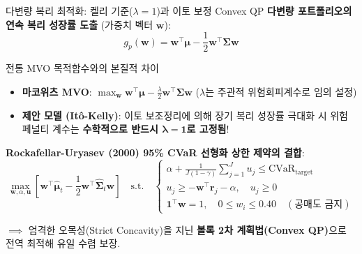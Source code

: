 \begin{frame}{다변량 복리 최적화: 켈리 기준($\lambda=1$)과 이토 보정 Convex QP}
\textbf{다변량 포트폴리오의 연속 복리 성장률 도출} (가중치 벡터 $\mathbf{w}$):
\begin{equation*}
  g_p(\mathbf{w}) = \mathbf{w}^\top \boldsymbol{\mu} - \frac{1}{2} \mathbf{w}^\top \boldsymbol{\Sigma} \mathbf{w}
\end{equation*}

\begin{block}{전통 MVO 목적함수와의 본질적 차이}
  \small
  \begin{itemize}
    \item \textbf{마코위츠 MVO}: $\max_{\mathbf{w}} \mathbf{w}^\top \boldsymbol{\mu} - \frac{\lambda}{2} \mathbf{w}^\top \boldsymbol{\Sigma} \mathbf{w}$ ($\lambda$는 주관적 위험회피계수로 임의 설정)
    \item \textbf{제안 모델 (Itô-Kelly)}: 이토 보조정리에 의해 장기 복리 성장률 극대화 시 위험 페널티 계수는 \textbf{수학적으로 반드시 $\boldsymbol{\lambda=1}$로 고정됨}!
  \end{itemize}
\end{block}

\vspace{1mm}
\textbf{Rockafellar-Uryasev (2000) 95\% CVaR 선형화 상한 제약의 결합}:
\begin{equation*}
  \max_{\mathbf{w}, \alpha, \mathbf{u}} \left[ \mathbf{w}^\top \hat{\boldsymbol{\mu}}_t - \frac{1}{2} \mathbf{w}^\top \hat{\boldsymbol{\Sigma}}_t \mathbf{w} \right] \quad
  \text{s.t.} \quad 
  \begin{cases}
    \alpha + \frac{1}{J(1-\gamma)} \sum_{j=1}^J u_j \le \text{CVaR}_{\text{target}} \\
    u_j \ge -\mathbf{w}^\top \mathbf{r}_j - \alpha, \quad u_j \ge 0 \\
    \mathbf{1}^\top \mathbf{w} = 1, \quad 0 \le w_i \le 0.40 \quad (\text{공매도 금지})
  \end{cases}
\end{equation*}

\vspace{1mm}
$\implies$ 엄격한 오목성(Strict Concavity)을 지닌 \textbf{볼록 2차 계획법(Convex QP)}으로 전역 최적해 유일 수렴 보장.
\end{frame}
